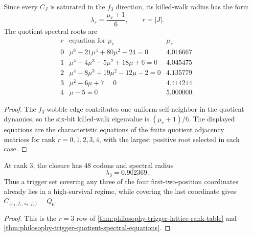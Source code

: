 \begin{theorem}
\label{thm:philosophy-trigger-quotient-spectral-equations}
Since every $C_{J}$ is saturated in the $f_{3}$ direction, its
killed-walk radius has the form
$$
  \lambda_{r}=\frac{\mu_{r}+1}{6},
  \qquad r=|J|.
$$
The quotient spectral roots are
$$
\begin{array}{c|l|r}
  r & \text{equation for }\mu_{r} & \mu_{r}\\
  \hline
  0 & \mu^{6}-21\mu^{4}+80\mu^{2}-24=0 & 4.016667\\
  1 & \mu^{4}-4\mu^{3}-5\mu^{2}+18\mu+6=0 & 4.045475\\
  2 & \mu^{4}-8\mu^{3}+19\mu^{2}-12\mu-2=0 & 4.135779\\
  3 & \mu^{2}-6\mu+7=0 & 4.414214\\
  4 & \mu-5=0 & 5.000000.
\end{array}
$$
\end{theorem}
\begin{proof}
The $f_{3}$-wobble edge contributes one uniform self-neighbor in the
quotient dynamics, so the six-bit killed-walk eigenvalue is
$(\mu_{r}+1)/6$. The displayed equations are the characteristic
equations of the finite quotient adjacency matrices for rank
$r=0,1,2,3,4$, with the largest positive root selected in each case.
\end{proof}

\begin{corollary}
\label{cor:philosophy-near-global-rank}
At rank $3$, the closure has $48$ codons and spectral radius
$$
  \lambda_{3}=0.902369.
$$
Thus a trigger set covering any three of the four first-two-position
coordinates already lies in a high-survival regime, while covering the
last coordinate gives $C_{\{s_{1},f_{1},s_{2},f_{2}\}}=Q_{6}$.
\end{corollary}
\begin{proof}
This is the $r=3$ row of
\autoref{thm:philosophy-trigger-lattice-rank-table} and
\autoref{thm:philosophy-trigger-quotient-spectral-equations}.
\end{proof}

